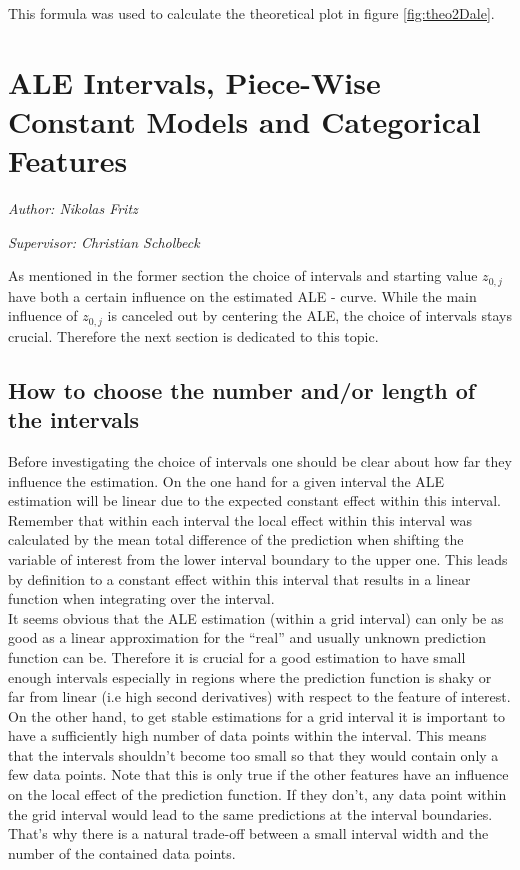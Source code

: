 \documentclass[]{krantz}
\begin{document}
This formula was used to calculate the theoretical plot in figure
\ref{fig:theo2Dale}.

\chapter{ALE Intervals, Piece-Wise Constant Models and Categorical
Features}\label{ale-misc}

\emph{Author: Nikolas Fritz}

\emph{Supervisor: Christian Scholbeck}

As mentioned in the former section the choice of intervals and starting
value \(z_{0,j}\) have both a certain influence on the estimated ALE -
curve. While the main influence of \(z_{0,j}\) is canceled out by
centering the ALE, the choice of intervals stays crucial. Therefore the
next section is dedicated to this topic.

\section{How to choose the number and/or length of the
intervals}\label{how-to-choose-the-number-andor-length-of-the-intervals}

Before investigating the choice of intervals one should be clear about
how far they influence the estimation. On the one hand for a given
interval the ALE estimation will be linear due to the expected constant
effect within this interval. Remember that within each interval the
local effect within this interval was calculated by the mean total
difference of the prediction when shifting the variable of interest from
the lower interval boundary to the upper one. This leads by definition
to a constant effect within this interval that results in a linear
function when integrating over the interval.\\
It seems obvious that the ALE estimation (within a grid interval) can
only be as good as a linear approximation for the ``real'' and usually
unknown prediction function can be. Therefore it is crucial for a good
estimation to have small enough intervals especially in regions where
the prediction function is shaky or far from linear (i.e high second
derivatives) with respect to the feature of interest. On the other hand,
to get stable estimations for a grid interval it is important to have a
sufficiently high number of data points within the interval. This means
that the intervals shouldn't become too small so that they would contain
only a few data points. Note that this is only true if the other
features have an influence on the local effect of the prediction
function. If they don't, any data point within the grid interval would
lead to the same predictions at the interval boundaries. That's why
there is a natural trade-off between a small interval width and the
number of the contained data points.
\end{document}
